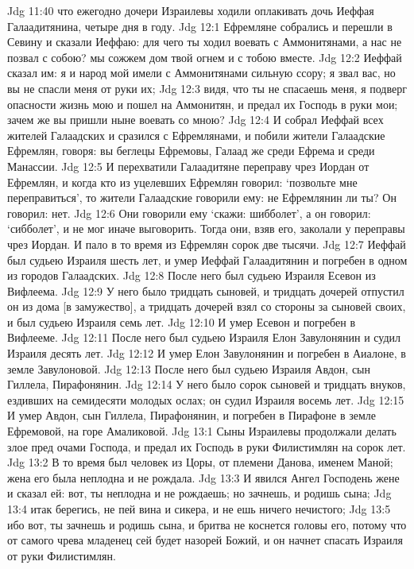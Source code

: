 Jdg 11:40  что ежегодно дочери Израилевы ходили оплакивать дочь Иеффая Галаадитянина, четыре дня в году.
Jdg 12:1  Ефремляне собрались и перешли в Севину и сказали Иеффаю: для чего ты ходил воевать с Аммонитянами, а нас не позвал с собою? мы сожжем дом твой огнем и с тобою вместе.
Jdg 12:2  Иеффай сказал им: я и народ мой имели с Аммонитянами сильную ссору; я звал вас, но вы не спасли меня от руки их;
Jdg 12:3  видя, что ты не спасаешь меня, я подверг опасности жизнь мою и пошел на Аммонитян, и предал их Господь в руки мои; зачем же вы пришли ныне воевать со мною?
Jdg 12:4  И собрал Иеффай всех жителей Галаадских и сразился с Ефремлянами, и побили жители Галаадские Ефремлян, говоря: вы беглецы Ефремовы, Галаад же среди Ефрема и среди Манассии.
Jdg 12:5  И перехватили Галаадитяне переправу чрез Иордан от Ефремлян, и когда кто из уцелевших Ефремлян говорил: `позвольте мне переправиться', то жители Галаадские говорили ему: не Ефремлянин ли ты? Он говорил: нет.
Jdg 12:6  Они говорили ему `скажи: шибболет', а он говорил: `сибболет', и не мог иначе выговорить. Тогда они, взяв его, заколали у переправы чрез Иордан. И пало в то время из Ефремлян сорок две тысячи.
Jdg 12:7  Иеффай был судьею Израиля шесть лет, и умер Иеффай Галаадитянин и погребен в одном из городов Галаадских.
Jdg 12:8  После него был судьею Израиля Есевон из Вифлеема.
Jdg 12:9  У него было тридцать сыновей, и тридцать дочерей отпустил он из дома [в замужество], а тридцать дочерей взял со стороны за сыновей своих, и был судьею Израиля семь лет.
Jdg 12:10  И умер Есевон и погребен в Вифлееме.
Jdg 12:11  После него был судьею Израиля Елон Завулонянин и судил Израиля десять лет.
Jdg 12:12  И умер Елон Завулонянин и погребен в Аиалоне, в земле Завулоновой.
Jdg 12:13  После него был судьею Израиля Авдон, сын Гиллела, Пирафонянин.
Jdg 12:14  У него было сорок сыновей и тридцать внуков, ездивших на семидесяти молодых ослах; он судил Израиля восемь лет.
Jdg 12:15  И умер Авдон, сын Гиллела, Пирафонянин, и погребен в Пирафоне в земле Ефремовой, на горе Амаликовой.
Jdg 13:1  Сыны Израилевы продолжали делать злое пред очами Господа, и предал их Господь в руки Филистимлян на сорок лет.
Jdg 13:2  В то время был человек из Цоры, от племени Данова, именем Маной; жена его была неплодна и не рождала.
Jdg 13:3  И явился Ангел Господень жене и сказал ей: вот, ты неплодна и не рождаешь; но зачнешь, и родишь сына;
Jdg 13:4  итак берегись, не пей вина и сикера, и не ешь ничего нечистого;
Jdg 13:5  ибо вот, ты зачнешь и родишь сына, и бритва не коснется головы его, потому что от самого чрева младенец сей будет назорей Божий, и он начнет спасать Израиля от руки Филистимлян.
